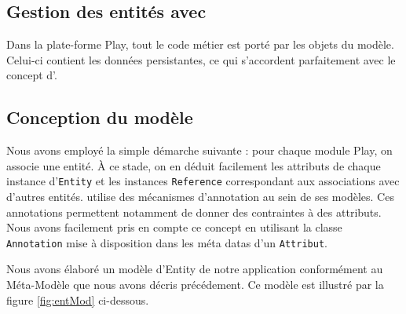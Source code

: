 \subsection{Gestion des entités avec \kwplay{}}

Dans la plate-forme Play, tout le code métier est porté par les objets du modèle. Celui-ci contient les données persistantes, ce qui s'accordent parfaitement avec le concept d'\kwentity.  
         

\subsection{Conception du modèle}
Nous avons employé la simple démarche suivante : pour chaque module Play, on associe une entité. À ce stade, on en déduit facilement les attributs de chaque instance d'\verb+Entity+ et les instances \verb+Reference+ correspondant aux associations avec d'autres entités. \kwplay{} utilise des mécanismes d'annotation au sein de ses modèles. Ces annotations permettent notamment de donner des contraintes à des attributs. Nous avons facilement pris en compte ce concept en utilisant la classe \verb+Annotation+ mise à disposition dans les méta datas d'un \verb+Attribut+.

Nous avons élaboré un modèle d'Entity de notre application conformément au Méta-Modèle que nous avons décris précédement. Ce modèle est illustré par la figure \ref{fig:entMod} ci-dessous.

